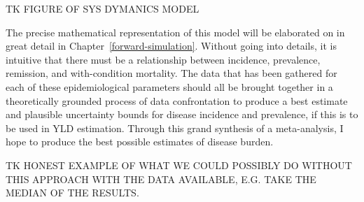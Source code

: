 TK FIGURE OF SYS DYMANICS MODEL

The precise mathematical representation of this model will be
elaborated on in great detail in
Chapter~\ref{forward-simulation}. Without going into details, it is
intuitive that there must be a relationship between
incidence, prevalence, remission, and with-condition mortality. The
data that has been gathered for each of these epidemiological
parameters should all be brought together in a theoretically grounded
process of data confrontation to produce a best estimate and plausible
uncertainty bounds for disease incidence and prevalence, if this is to
be used in YLD estimation. Through this grand synthesis of a
meta-analysis, I hope to produce the best possible estimates of
disease burden.

TK HONEST EXAMPLE OF WHAT WE COULD POSSIBLY DO WITHOUT THIS APPROACH
WITH THE DATA AVAILABLE, E.G. TAKE THE MEDIAN OF THE RESULTS.


